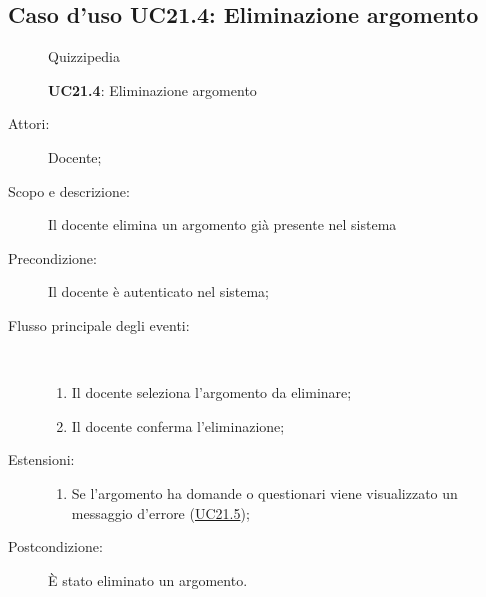 \subsection{Caso d'uso UC21.4: Eliminazione argomento}
\begin{figure}[H]
	\centering
	\begin{resizedtikzpicture}{\textwidth}
		\begin{umlsystem}[x=0, fill=lightgray!20]{Quizzipedia}
		\end{umlsystem}
	\end{resizedtikzpicture}
	\caption{\textbf{UC21.4}: Eliminazione argomento}
	\label{UC21.4}
\end{figure}
\begin{description}
	\item[Attori:] Docente;
	\item[Scopo e descrizione:] Il docente elimina un argomento già presente nel sistema
	\item[Precondizione:] Il docente è autenticato nel sistema;
	
	\item[Flusso principale degli eventi:] \ 
	\begin{enumerate}
		\item Il docente seleziona l'argomento da eliminare;
		\item Il docente conferma l'eliminazione;
		
	\end{enumerate}
	\item[Estensioni:]
	\begin{enumerate}
		\item Se l'argomento ha domande o questionari viene visualizzato un messaggio d'errore (\hyperlink{UC21.5}{UC21.5});
		
	\end{enumerate}
	\item[Postcondizione:] È stato eliminato un argomento.
\end{description}
\hypertarget{UC21.5}{}

